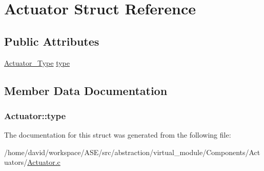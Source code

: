\hypertarget{structActuator}{
\section{Actuator Struct Reference}
\label{structActuator}
}
\subsection*{Public Attributes}
\begin{CompactItemize}
\item 
\hyperlink{Actuator_8h_aab256d85bd4ff3aebd907015b0c153d}{Actuator\_\-Type} \hyperlink{structActuator_dc854c5c6a9501c6e65340df31a36b2a}{type}
\end{CompactItemize}


\subsection{Member Data Documentation}
\hypertarget{structActuator_dc854c5c6a9501c6e65340df31a36b2a}{
\subsubsection{ {\bf Actuator::type}}}
\label{structActuator_dc854c5c6a9501c6e65340df31a36b2a}




The documentation for this struct was generated from the following file:\begin{CompactItemize}
\item 
/home/david/workspace/ASE/src/abstraction/virtual\_\-module/Components/Actuators/\hyperlink{Actuator_8c}{Actuator.c}\end{CompactItemize}
